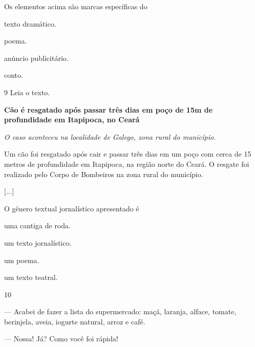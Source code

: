 \pagebreak
Os elementos acima são marcas específicas do

\begin{escolha}
\begin{multicols}{2}
\item texto dramático.

\item poema.

\item anúncio publicitário.

\item conto.
\end{multicols}
\end{escolha}

\num{9} Leia o texto.

\begin{myquote}
\textbf{Cão é resgatado após passar três dias em poço de 15m de profundidade em Itapipoca, no Ceará}

\emph{O caso aconteceu na localidade de Galego, zona rural do município.}

Um cão foi resgatado após cair e passar três dias em um poço com cerca
de 15 metros de profundidade em Itapipoca, na região norte do Ceará. 
O resgate foi realizado pelo Corpo de Bombeiros na zona rural do município.

{[}...{]}

\end{myquote}

O gênero textual jornalístico apresentado é

\begin{escolha}
\item uma cantiga de roda.

\item um texto jornalístico.

\item um poema.

\item um texto teatral.
\end{escolha}

\num{10}

\begin{myquote}
\textit{ }

--- Acabei de fazer a lista do supermercado: maçã, laranja, alface,
tomate, berinjela, aveia, iogurte natural, arroz e café.

--- Nossa! Já? Como você foi rápida!
\end{myquote}

